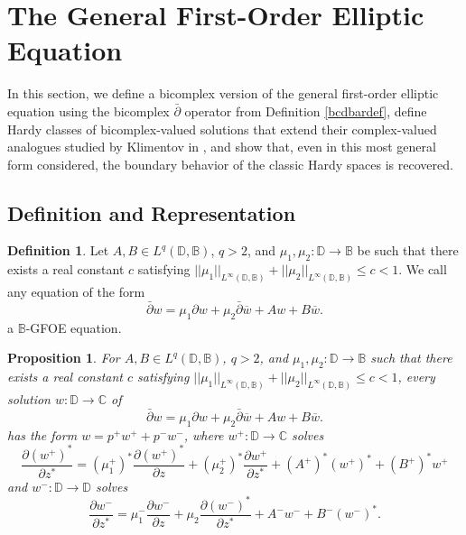 \documentclass[12pt,reqno]{amsart}
\newtheorem{prop}[theorem]{Proposition}
\theoremstyle{definition}
\newtheorem{deff}[theorem]{Definition}
\theoremstyle{remark}
\newcommand{\C}{\mathbb C}
\newcommand{\p}{\partial}
\newcommand{\dbar}{\bar\partial}
\newcommand{\bc}{\mathbb{B}}
\newcommand{\disk}{\mathbb{D}}
\begin{document}
\section{The General First-Order Elliptic Equation}\label{section: GFOE}

In this section, we define a bicomplex version of the general first-order elliptic equation using the bicomplex $\dbar$ operator from Definition \ref{bcdbardef}, define Hardy classes of bicomplex-valued solutions that extend their complex-valued analogues studied by Klimentov in \cite{Klim2016}, and show that, even in this most general form considered, the boundary behavior of the classic Hardy spaces is recovered. 

\subsection{Definition and Representation}

\begin{deff}
    Let $A, B \in L^q(\disk,\bc)$, $q>2$, and $\mu_1,\mu_2 : \disk \to \bc$ be such that there exists a real constant $c$ satisfying $||\mu_1||_{L^\infty(\disk,\bc)}+||\mu_2||_{L^\infty(\disk,\bc)} \leq c < 1$. We call any equation of the form 
    \[
        \dbar w = \mu_1  \p w + \mu_2 \dbar \overline{w} + Aw + B\overline{w}.
    \]
    a $\bc$-GFOE equation. 
\end{deff}

\begin{prop}
     For $A, B \in L^q(\disk,\bc)$, $q>2$, and $\mu_1,\mu_2 : \disk \to \bc$ such that there exists a real constant $c$ satisfying $||\mu_1||_{L^\infty(\disk,\bc)}+||\mu_2||_{L^\infty(\disk,\bc)} \leq c < 1$, every solution $w:\disk\to\C$ of
     \[
        \dbar w = \mu_1  \p w + \mu_2 \dbar \overline{w} + Aw + B\overline{w}.
    \]
    has the form $w = p^+ w^+ + p^- w^-$, where $w^+: \disk \to\mathbb{C}$ solves
    \[
        \frac{\p (w^+)^*}{\p z^*} = (\mu_1^+)^* \frac{\p (w^+)^*}{\p z} + (\mu_2^+)^*\frac{\p w^+}{\p z^*} + (A^+)^* (w^+)^* + (B^+)^* w^+
    \]
    and $w^-:\disk\to\mathbb{D}$ solves
    \[
        \frac{\p w^-}{\p z^*} = \mu_1^- \frac{\p w^-}{\p z} + \mu_2 \frac{\p (w^-)^*}{\p z^*} + A^- w^- + B^- (w^-)^*.
    \]
\end{prop}
\end{document}
